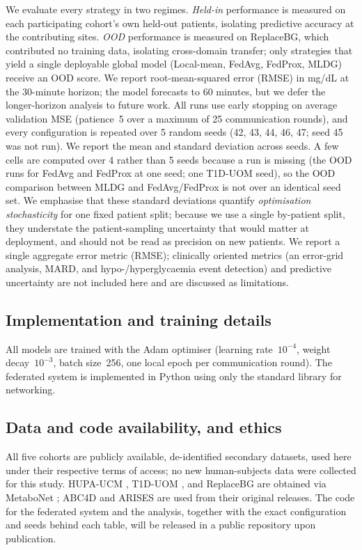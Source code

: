 \documentclass[10pt,letterpaper]{article}
\begin{document}
We evaluate every strategy in two regimes. \emph{Held-in} performance is measured
on each participating cohort's own held-out patients, isolating predictive
accuracy at the contributing sites. \emph{OOD} performance is measured on
ReplaceBG, which contributed no training data, isolating cross-domain transfer;
only strategies that yield a single deployable global model (Local-mean, FedAvg,
FedProx, MLDG) receive an OOD score. We report root-mean-squared error (RMSE) in
mg/dL at the 30-minute horizon; the model forecasts to 60 minutes, but we defer
the longer-horizon analysis to future work. All runs use early stopping on
average validation MSE (patience~5 over a maximum of 25 communication rounds),
and every configuration is repeated over 5 random seeds (42, 43, 44, 46, 47; seed
45 was not run). We report the mean and standard deviation across seeds. A few
cells are computed over 4 rather than 5 seeds because a run is missing (the OOD
runs for FedAvg and FedProx at one seed; one T1D-UOM seed), so the OOD comparison
between MLDG and FedAvg/FedProx is not over an identical seed set. We emphasise
that these standard deviations quantify \emph{optimisation stochasticity} for one
fixed patient split; because we use a single by-patient split, they understate
the patient-sampling uncertainty that would matter at deployment, and should not
be read as precision on new patients. We report a single aggregate error metric
(RMSE); clinically oriented metrics (an error-grid analysis, MARD, and
hypo-/hyperglycaemia event detection) and predictive uncertainty are not included
here and are discussed as limitations.

\subsection*{Implementation and training details}

All models are trained with the Adam optimiser (learning rate~$10^{-4}$, weight
decay~$10^{-3}$, batch size~256, one local epoch per communication round). The
federated system is implemented in Python using only the standard library for
networking.

\subsection*{Data and code availability, and ethics}

All five cohorts are publicly available, de-identified secondary datasets, used
here under their respective terms of access; no new human-subjects data were
collected for this study. HUPA-UCM \cite{hidalgo2024hupaucm}, T1D-UOM
\cite{alsuhaymi2025t1duom}, and ReplaceBG \cite{aleppo2017replacebg} are obtained
via MetaboNet \cite{wolff2026metabonet}; ABC4D and ARISES are used from their
original releases. The code for the federated system and the analysis, together
with the exact configuration and seeds behind each table, will be released in a
public repository upon publication.
\end{document}
